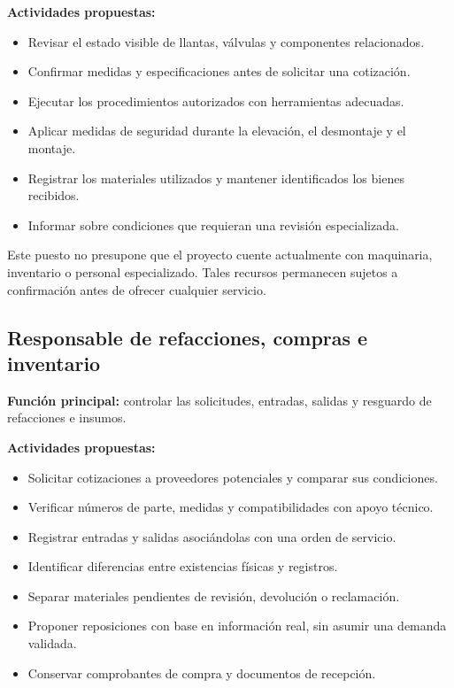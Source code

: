 \documentclass[12pt,letterpaper,oneside]{article}
\begin{document}
\textbf{Actividades propuestas:}
\begin{itemize}
    \item Revisar el estado visible de llantas, válvulas y componentes relacionados.
    \item Confirmar medidas y especificaciones antes de solicitar una cotización.
    \item Ejecutar los procedimientos autorizados con herramientas adecuadas.
    \item Aplicar medidas de seguridad durante la elevación, el desmontaje y el montaje.
    \item Registrar los materiales utilizados y mantener identificados los bienes recibidos.
    \item Informar sobre condiciones que requieran una revisión especializada.
\end{itemize}

Este puesto no presupone que el proyecto cuente actualmente con maquinaria, inventario o personal especializado. Tales recursos permanecen sujetos a confirmación antes de ofrecer cualquier servicio.

\subsection{Responsable de refacciones, compras e inventario}

\textbf{Función principal:} controlar las solicitudes, entradas, salidas y resguardo de refacciones e insumos.

\textbf{Actividades propuestas:}
\begin{itemize}
    \item Solicitar cotizaciones a proveedores potenciales y comparar sus condiciones.
    \item Verificar números de parte, medidas y compatibilidades con apoyo técnico.
    \item Registrar entradas y salidas asociándolas con una orden de servicio.
    \item Identificar diferencias entre existencias físicas y registros.
    \item Separar materiales pendientes de revisión, devolución o reclamación.
    \item Proponer reposiciones con base en información real, sin asumir una demanda validada.
    \item Conservar comprobantes de compra y documentos de recepción.
\end{itemize}
\end{document}
